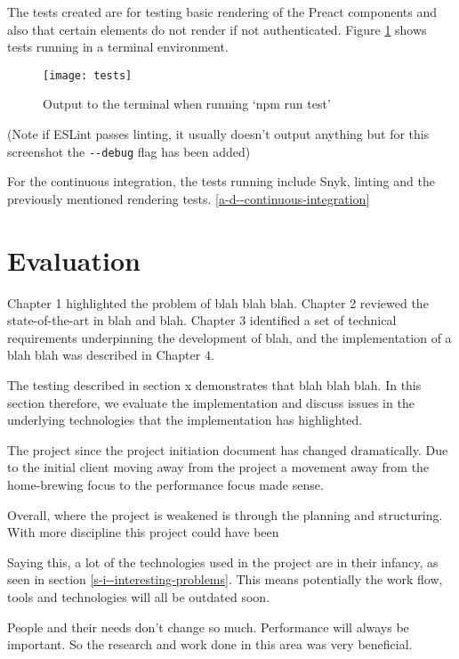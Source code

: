 The tests created are for testing basic rendering of the Preact components and also that certain elements do not render if not authenticated. Figure \ref{figure-tests} shows tests running in a terminal environment.

\begin{figure}[H]
  \centering
    \texttt{[image: tests]}
  \caption{Output to the terminal when running `npm run test'}
  \label{figure-tests}
\end{figure}

(Note if ESLint passes linting, it usually doesn't output anything but for this screenshot the \verb|--debug| flag has been added)

For the continuous integration, the tests running include Snyk, linting and the previously mentioned rendering tests. \ref{a-d--continuous-integration}

\section{Evaluation} \label{s-i--evaluation}

Chapter 1 highlighted the problem of blah blah blah. Chapter 2 reviewed the state-of-the-art in blah and blah.  Chapter 3 identified a set of technical requirements underpinning the development of blah, and the implementation of a blah blah was described in Chapter 4.

The testing described in section x demonstrates that blah blah blah. In this section therefore, we evaluate the implementation and discuss issues in the underlying technologies that the implementation has highlighted.

The project since the project initiation document has changed dramatically. Due to the initial client moving away from the project a movement away from the home-brewing focus to the performance focus made sense. %

Overall, where the project is weakened is through the planning and structuring. With more discipline this project could have been

Saying this, a lot of the technologies used in the project are in their infancy, as seen in section \ref{s-i--interesting-problems}. This means potentially the work flow, tools and technologies will all be outdated soon.

People and their needs don't change so much. Performance will always be important. So the research and work done in this area was very beneficial.

